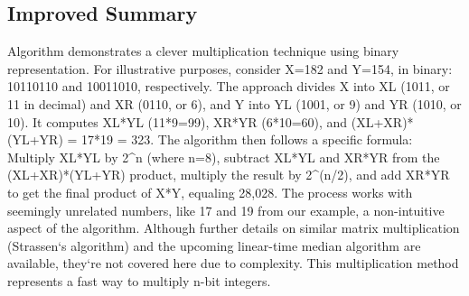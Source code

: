 \subsection*{Improved  Summary}
Algorithm demonstrates a clever multiplication technique using binary representation.
For illustrative purposes, consider X=182 and Y=154, in binary: 10110110 and 10011010, respectively.
The approach divides X into XL (1011, or 11 in decimal) and XR (0110, or 6), and Y into YL (1001, or 9) and YR (1010, or 10).
It computes XL*YL (11*9=99), XR*YR (6*10=60), and (XL+XR)*(YL+YR) = 17*19 = 323.
The algorithm then follows a specific formula: Multiply XL*YL by 2\textasciicircum{}n (where n=8), subtract XL*YL and XR*YR from the (XL+XR)*(YL+YR) product, multiply the result by 2\textasciicircum{}(n/2), and add XR*YR to get the final product of X*Y, equaling 28,028.
The process works with seemingly unrelated numbers, like 17 and 19 from our example, a non-intuitive aspect of the algorithm.
Although further details on similar matrix multiplication (Strassen`s algorithm) and the upcoming linear-time median algorithm are available, they`re not covered here due to complexity.
This multiplication method represents a fast way to multiply n-bit integers.

